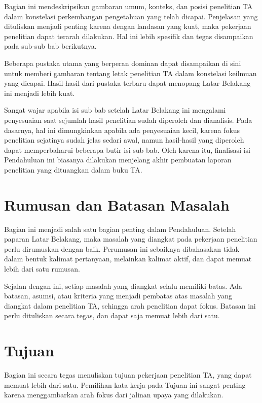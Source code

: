 
Bagian ini mendeskripsikan gambaran umum, konteks, dan posisi penelitian TA dalam konstelasi perkembangan pengetahuan yang telah dicapai. Penjelasan yang dituliskan menjadi penting karena dengan landasan yang kuat, maka pekerjaan penelitian dapat terarah dilakukan. Hal ini lebih spesifik dan tegas disampaikan pada sub-sub bab berikutnya.

Beberapa pustaka utama yang berperan dominan dapat disampaikan di sini untuk memberi gambaran tentang letak penelitian TA dalam konstelasi keilmuan yang dicapai. Hasil-hasil dari pustaka terbaru dapat menopang Latar Belakang ini menjadi lebih kuat.

Sangat wajar apabila isi sub bab setelah Latar Belakang ini mengalami penyesuaian saat sejumlah hasil penelitian sudah diperoleh dan dianalisis. Pada dasarnya, hal ini dimungkinkan apabila ada penyesuaian kecil, karena fokus penelitian sejatinya sudah jelas sedari awal, namun hasil-hasil yang diperoleh dapat memperbaharui beberapa butir isi sub bab. Oleh karena itu, finalisasi isi Pendahuluan ini biasanya dilakukan menjelang akhir pembuatan laporan penelitian yang dituangkan dalam buku TA.


\section{Rumusan dan Batasan Masalah}
\noindent Bagian ini menjadi salah satu bagian penting dalam Pendahuluan. Setelah paparan Latar Belakang, maka masalah yang diangkat pada pekerjaan penelitian perlu dirumuskan dengan baik. Perumusan ini sebaiknya dibahasakan tidak dalam bentuk kalimat pertanyaan, melainkan kalimat aktif, dan dapat memuat lebih dari satu rumusan.

Sejalan dengan ini, setiap masalah yang diangkat selalu memiliki batas. Ada batasan, asumsi, atau kriteria yang menjadi pembatas atas masalah yang diangkat dalam penelitian TA, sehingga arah penelitian dapat fokus. Batasan ini perlu dituliskan secara tegas, dan dapat saja memuat lebih dari satu.


\section{Tujuan}
\label{sec:tujuan}
Bagian ini secara tegas menuliskan tujuan pekerjaan penelitian TA, yang dapat memuat lebih dari satu. Pemilihan kata kerja pada Tujuan ini sangat penting karena menggambarkan arah fokus dari jalinan upaya yang dilakukan.



